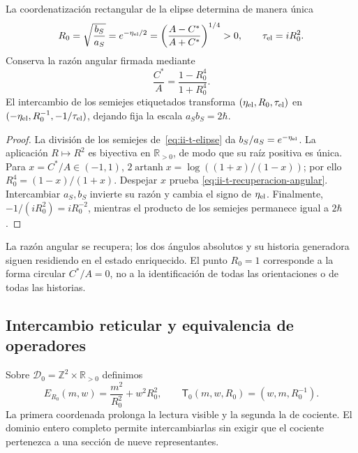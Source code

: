 \begin{proposition}
\label{prop:ii-t-radio}
La coordenatización rectangular de la elipse determina de manera única
\begin{equation}
 R_0=\sqrt{\frac{b_S}{a_S}}
 =e^{-\eta_{\rm el}/2}
 =\left(\frac{A-C^*}{A+C^*}\right)^{1/4}>0,
 \qquad \tau_{\rm el}=iR_0^2.
 \label{eq:ii-t-radio}
\end{equation}
Conserva la razón angular firmada mediante
\begin{equation}
 \frac{C^*}{A}=\frac{1-R_0^4}{1+R_0^4}.
 \label{eq:ii-t-recuperacion-angular}
\end{equation}
El intercambio de los semiejes etiquetados transforma
\((\eta_{\rm el},R_0,\tau_{\rm el})\) en
\((-\eta_{\rm el},R_0^{-1},-1/\tau_{\rm el})\), dejando fija
la escala \(a_Sb_S=2\hbar\).
\end{proposition}

\begin{proof}
La división de los semiejes de~\eqref{eq:ii-t-elipse} da
\(b_S/a_S=e^{-\eta_{\rm el}}\). La aplicación \(R\mapsto R^2\)
es biyectiva en \(\mathbb R_{>0}\), de modo que su raíz positiva es
única. Para \(x=C^*/A\in(-1,1)\),
\(2\operatorname{artanh}x=\log((1+x)/(1-x))\); por ello
\(R_0^4=(1-x)/(1+x)\). Despejar \(x\) prueba
\eqref{eq:ii-t-recuperacion-angular}. Intercambiar \(a_S,b_S\)
invierte su razón y cambia el signo de \(\eta_{\rm el}\). Finalmente,
\(-1/(iR_0^2)=iR_0^{-2}\), mientras el producto de los semiejes
permanece igual a \(2\hbar\).
\end{proof}

La razón angular se recupera; los dos ángulos absolutos y su historia
generadora siguen residiendo en el estado enriquecido. El punto \(R_0=1\)
corresponde a la forma circular \(C^*/A=0\), no a la identificación de
todas las orientaciones o de todas las historias.

\subsection{Intercambio reticular y equivalencia de operadores}

\begin{definition}
\label{def:ii-t-reticular}
Sobre \(\mathscr D_0=\mathbb Z^2\times\mathbb R_{>0}\) definimos
\begin{equation}
 E_{R_0}(m,w)=\frac{m^2}{R_0^2}+w^2R_0^2,\qquad
 \mathsf T_0(m,w,R_0)=(w,m,R_0^{-1}).
 \label{eq:ii-t-energia}
\end{equation}
La primera coordenada prolonga la lectura visible y la segunda la de
cociente. El dominio entero completo permite intercambiarlas sin exigir
que el cociente pertenezca a una sección de nueve representantes.
\end{definition}

